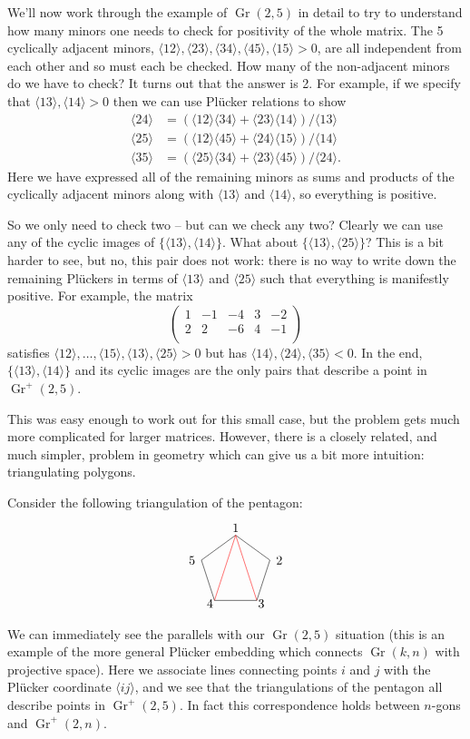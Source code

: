 \documentclass[11pt]{article}
\DeclareMathOperator{\Gr}{Gr}
\def\ket#1{\langle #1 \rangle}
\def\drawLabeledPentagon{
\coordinate (P1) at (90:1);
\coordinate (P2) at (18:1);
\coordinate (P3) at (306:1);
\coordinate (P4) at (234:1);
\coordinate (P5) at (162:1);
\draw (P1) -- (P2) -- (P3) -- (P4) -- (P5) -- cycle;
\draw (0,1.2) node {1};
\draw (1,.3) node[anchor=west] {2};
\draw (.5,-.9) node[anchor=west] {3};
\draw (-.5,-.9) node[anchor=east] {4};
\draw (-1,.3) node[anchor=east] {5};
}
\begin{document}
We'll now work through the example of $\Gr(2,5)$ in detail to try to understand how many minors one needs to check for positivity of the whole matrix. The 5 cyclically adjacent minors, $\ket{12}, \ket{23}, \ket{34}, \ket{45}, \ket{15}> 0$, are all independent from each other and so must each be checked. How many of the non-adjacent minors do we have to check? It turns out that the answer is 2. For example, if we specify that $\ket{13}, \ket{14}>0$ then we can use Pl\"ucker relations to show
\begin{equation}
\begin{split}
	\ket{24} &= (\ket{12}\ket{34} + \ket{23}\ket{14})/\ket{13}\\
	\ket{25} &= (\ket{12}\ket{45} + \ket{24}\ket{15})/\ket{14}\\
	\ket{35} &= (\ket{25}\ket{34} + \ket{23}\ket{45})/\ket{24}.
\end{split}	 	
\end{equation} 
Here we have expressed all of the remaining minors as sums and products of the cyclically adjacent minors along with $\ket{13}$ and $\ket{14}$, so everything is positive. 

So we only need to check two -- but can we check any two? Clearly we can use any of the cyclic images of $\{\ket{13}, \ket{14}\}$. What about $\{\ket{13}, \ket{25}\}$? This is a bit harder to see, but no, this pair does not work: there is no way to write down the remaining Pl\"uckers in terms of $\ket{13}$ and $\ket{25}$ such that everything is manifestly positive. For example, the matrix
\begin{equation}
\left(
\begin{array}{ccccc}
 1 & -1 & -4 & 3 & -2 \\
 2 & 2 & -6 & 4 & -1 \\
\end{array}
\right)
\end{equation}
satisfies $\ket{12},\ldots,\ket{15},\ket{13},\ket{25}>0$ but has $\ket{14},\ket{24},\ket{35}<0$. In the end, $\{\ket{13}, \ket{14}\}$ and its cyclic images are the only pairs that describe a point in $\Gr^+(2,5)$. 

This was easy enough to work out for this small case, but the problem gets much more complicated for larger matrices. However, there is a closely related, and much simpler, problem in geometry which can give us a bit more intuition: triangulating polygons.

Consider the following triangulation of the pentagon:
\begin{equation}
\begin{tikzpicture}
  \drawLabeledPentagon
  \draw[color=red] (P1) -- (P3);
  \draw[color=red] (P1) -- (P4);
\end{tikzpicture}
\end{equation}
We can immediately see the parallels with our $\Gr(2,5)$ situation (this is an example of the more general Pl\"ucker embedding which connects $\Gr(k,n)$ with projective space). Here we associate lines connecting points $i$ and $j$ with the Pl\"ucker coordinate $\ket{ij}$, and we see that the triangulations of the pentagon all describe points in $\Gr^+(2,5)$. In fact this correspondence holds between $n$-gons and $\Gr^+(2,n)$. 
\end{document}
